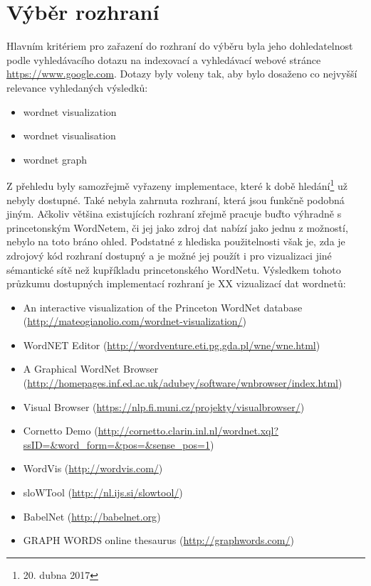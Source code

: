 \documentclass[a4paper, 11pt, oneside]{book}
\begin{document}
			\section{Výběr rozhraní}

				Hlavním kritériem pro zařazení do rozhraní do výběru byla jeho dohledatelnost podle vyhledávacího dotazu na indexovací a vyhledávací webové stránce \url{https://www.google.com}. Dotazy byly voleny tak, aby bylo dosaženo co nejvyšší relevance vyhledaných výsledků:

					\begin{itemize}
						\item wordnet visualization
						\item wordnet visualisation
						\item wordnet graph
					\end{itemize}

				Z přehledu byly samozřejmě vyřazeny implementace, které k době hledání\footnote{20. dubna 2017} už nebyly dostupné. Také nebyla zahrnuta rozhraní, která jsou funkčně podobná jiným. Ačkoliv většina existujících rozhraní zřejmě pracuje buďto výhradně s princetonským WordNetem, či jej jako zdroj dat nabízí jako jednu z možností, nebylo na toto bráno ohled. Podstatné z hlediska použitelnosti však je, zda je zdrojový kód rozhraní dostupný a je možné jej použít i pro vizualizaci jiné sémantické sítě než kupříkladu princetonského WordNetu. Výsledkem tohoto průzkumu dostupných implementací rozhraní je XX vizualizací dat wordnetů:

					\begin{itemize}
						\item An interactive visualization of the Princeton WordNet database (\url{http://mateogianolio.com/wordnet-visualization/})
						\item WordNET Editor (\url{http://wordventure.eti.pg.gda.pl/wne/wne.html})
						\item A Graphical WordNet Browser (\url{http://homepages.inf.ed.ac.uk/adubey/software/wnbrowser/index.html})
						\item Visual Browser (\url{https://nlp.fi.muni.cz/projekty/visualbrowser/})
						\item Cornetto Demo (\url{http://cornetto.clarin.inl.nl/wordnet.xql?ssID=&word_form=&pos=&sense_pos=1})
						\item WordVis (\url{http://wordvis.com/})
						\item sloWTool (\url{http://nl.ijs.si/slowtool/})
						\item BabelNet (\url{http://babelnet.org})
						\item GRAPH WORDS online thesaurus (\url{http://graphwords.com/})
					\end{itemize}
\end{document}
